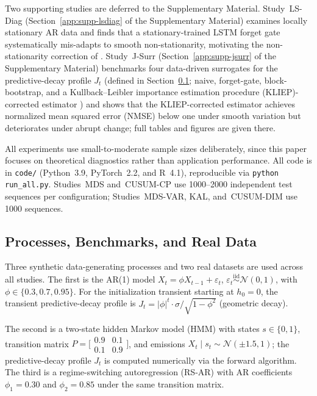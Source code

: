 \documentclass[bj,authoryear]{imsart}
\theoremstyle{plain}
\theoremstyle{definition}
\newcommand{\given}{\mid}
\newcommand{\iid}{\overset{\mathrm{iid}}{\sim}}
\begin{document}
Two supporting studies are deferred to the Supplementary Material.
Study~LS-Diag (Section~\ref{app:supp-lsdiag} of the Supplementary Material) examines locally stationary AR data and finds that a
stationary-trained LSTM forget gate systematically mis-adapts to smooth
non-stationarity, motivating the non-stationarity correction of
\citet{chang2026jrssb}.
Study~J-Surr (Section~\ref{app:supp-jsurr} of the Supplementary Material) benchmarks four data-driven surrogates for the
predictive-decay profile $J_t$ (defined in Section~\ref{sec:processes};
naive, forget-gate, block-bootstrap, and a
Kullback--Leibler importance estimation procedure (KLIEP)-corrected estimator
\citealt{sugiyama2012density}) and shows that the KLIEP-corrected estimator
achieves normalized mean squared error (NMSE) below one under smooth variation
but deteriorates under abrupt change; full tables and figures are given there.

All experiments use small-to-moderate sample sizes deliberately, since this
paper focuses on theoretical diagnostics rather than application performance.
All code is in \texttt{code/} (Python~3.9, PyTorch~2.2, and R~4.1),
reproducible via \texttt{python run\_all.py}.
Studies~MDS and~CUSUM-CP use 1000--2000 independent test sequences per configuration;
Studies~MDS-VAR, KAL, and~CUSUM-DIM use 1000 sequences.

\subsection{Processes, Benchmarks, and Real Data}
\label{sec:processes}

Three synthetic data-generating processes and two real datasets are used
across all studies.  The first is the AR(1) model $X_t = \phi X_{t-1} + \varepsilon_t$,
$\varepsilon_t \iid \mathcal{N}(0,1)$, with $\phi \in \{0.3, 0.7, 0.95\}$.
For the initialization transient starting at $h_0 = 0$,
the transient predictive-decay profile is
$J_t = |\phi|^t \cdot \sigma/\sqrt{1-\phi^2}$ (geometric decay).

The second is a two-state hidden Markov model (HMM) with states $s\in\{0,1\}$,
transition matrix
$P=\bigl[\begin{smallmatrix}0.9&0.1\\0.1&0.9\end{smallmatrix}\bigr]$,
and emissions $X_t\given s_t \sim \mathcal{N}(\pm 1.5, 1)$;
the predictive-decay profile $J_t$ is computed numerically via the forward algorithm.
The third is a regime-switching autoregression (RS-AR) with AR coefficients
$\phi_1 = 0.30$ and $\phi_2 = 0.85$ under the same transition matrix.
\end{document}
